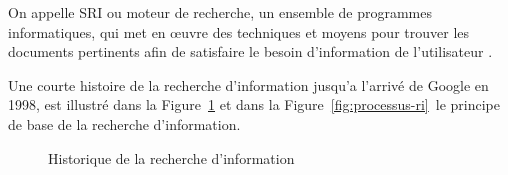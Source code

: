 \begin{definition}
    On appelle SRI ou moteur de recherche, un ensemble de programmes informatiques, qui met en œuvre des techniques et moyens pour trouver les documents pertinents afin de satisfaire le besoin d'information de l'utilisateur \citep{approche-semantique}.
\end{definition}

Une courte histoire de la recherche d'information jusqu'a l'arrivé de Google en 1998, est illustré dans la Figure~\ref{fig:ir-history} et dans la Figure~\ref{fig:processus-ri}~le principe de base de la recherche d'information.

\begin{figure}[htbp]
    \begin{center}
    \end{center}
    \caption{Historique de la recherche d'information \citep{ir-course}}\label{fig:ir-history}
\end{figure}

